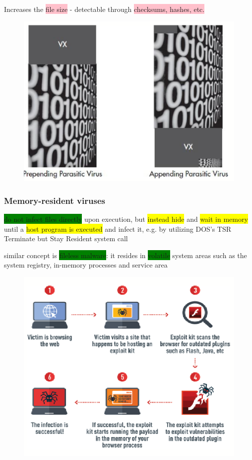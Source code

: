 \documentclass[]{project_plan}
\begin{document}
Increases the \colorbox{pink}{file size} - detectable through \colorbox{pink}{checksums, hashes, etc.}

\begin{figure}[H]
  \centering
  \includegraphics*[width=.7\linewidth]{parasitic_viruses.png}
\end{figure}

\subsubsection{Memory-resident viruses}
\colorbox{green}{do not infect files directly} upon execution, but \colorbox{yellow}{instead hide} and
\colorbox{yellow}{wait in memory} until a \colorbox{yellow}{host program is executed} and infect it, e.g.
by utilizing DOS’s TSR Terminate but Stay Resident system call

similar concept is \colorbox{green}{fileless malware}: it resides in \colorbox{green}{volatile} system
areas such as the system registry, in-memory processes and
service area

\begin{figure}[H]
  \centering
  \includegraphics*[width=.7\linewidth]{memory_resident_viruses.png}
\end{figure}
\end{document}
